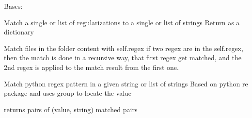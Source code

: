 \documentclass[letterpaper,10pt,english]{sphinxmanual}
\begin{document}
\begin{fulllineitems}
\label{\detokenize{scibeam.core:scibeam.core.regexp.RegMatch}}
Bases: 

\begin{fulllineitems}
\label{\detokenize{scibeam.core:scibeam.core.regexp.RegMatch.match}}
Match a single or list of regularizations to a single or list of strings
Return as a dictionary

\end{fulllineitems}


\begin{fulllineitems}
\label{\detokenize{scibeam.core:scibeam.core.regexp.RegMatch.matchFolder}}
Match files in the folder content with self.regex
if two regex are in the self.regex, then the match is done
in a recursive way, that first regex get matched, and the 2nd
regex is applied to the match result from the first one.

\end{fulllineitems}


\begin{fulllineitems}
\label{\detokenize{scibeam.core:scibeam.core.regexp.RegMatch.regex}}
\end{fulllineitems}


\begin{fulllineitems}
\label{\detokenize{scibeam.core:scibeam.core.regexp.RegMatch.single_regex_match}}
Match python regex pattern in a given string or list of strings
Based on python re package and uses group to locate the value

returns pairs of (value, string) matched pairs

\end{fulllineitems}


\end{fulllineitems}
\end{document}
